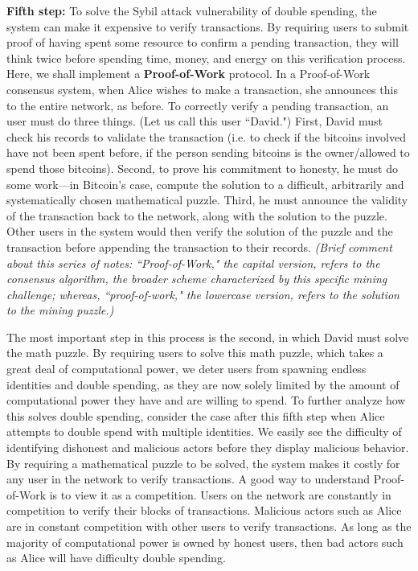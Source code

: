 \documentclass[full.tex]{subfiles}
\begin{document}
    \textbf{Fifth step:} To solve the Sybil attack vulnerability of double spending, the system can make it expensive to verify transactions. By requiring users to submit proof of having spent some resource to confirm a pending transaction, they will think twice before spending time, money, and energy on this verification process. Here, we shall implement a \textbf{Proof-of-Work} protocol. In a Proof-of-Work consensus system, when Alice wishes to make a transaction, she announces this to the entire network, as before. To correctly verify a pending transaction, an user must do three things. (Let us call this user ``David.") First, David must check his records to validate the transaction (i.e. to check if the bitcoins involved have not been spent before, if the person sending bitcoins is the owner/allowed to spend those bitcoins). Second, to prove his commitment to honesty, he must do some work---in Bitcoin's case, compute the solution to a difficult, arbitrarily and systematically chosen mathematical puzzle. Third, he must announce the validity of the transaction back to the network, along with the solution to the puzzle. Other users in the system would then verify the solution of the puzzle and the transaction before appending the transaction to their records. \textit{(Brief comment about this series of notes: ``Proof-of-Work," the capital version, refers to the consensus algorithm, the broader scheme characterized by this specific mining challenge; whereas, ``proof-of-work," the lowercase version, refers to the solution to the mining puzzle.)}
    
    The most important step in this process is the second, in which David must solve the math puzzle. By requiring users to solve this math puzzle, which takes a great deal of computational power, we deter users from spawning endless identities and double spending, as they are now solely limited by the amount of computational power they have and are willing to spend. To further analyze how this solves double spending, consider the case after this fifth step when Alice attempts to double spend with multiple identities. We easily see the difficulty of identifying dishonest and malicious actors before they display malicious behavior. By requiring a mathematical puzzle to be solved, the system makes it costly for any user in the network to verify transactions. A good way to understand Proof-of-Work is to view it as a competition. Users on the network are constantly in competition to verify their blocks of transactions. Malicious actors such as Alice are in constant competition with other users to verify transactions. As long as the majority of computational power is owned by honest users, then bad actors such as Alice will have difficulty double spending.
    
\end{document}
